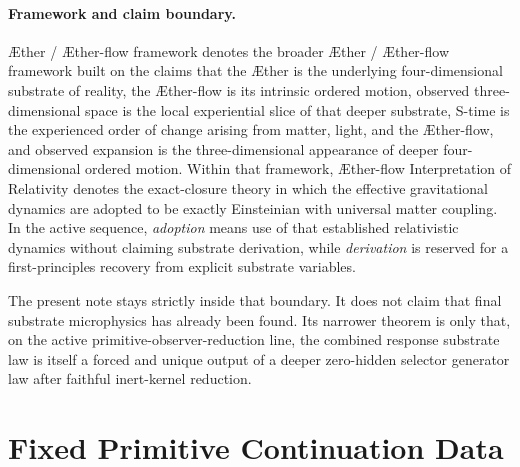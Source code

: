 \documentclass[11pt]{article}
\newcommand{\Aether}{\AE{}ther}
\newcommand{\Aflow}{\AE{}ther-flow}
\newcommand{\TheoryName}{\Aflow{} Interpretation of Relativity}
\newcommand{\TheoryProgram}{\Aether{} / \Aflow{} framework}
\begin{document}
\paragraph{Framework and claim boundary.}
\TheoryProgram{} denotes the broader \Aether{} / \Aflow{} framework built on the claims that the \Aether{} is the underlying four-dimensional substrate of reality, the \Aflow{} is its intrinsic ordered motion, observed three-dimensional space is the local experiential slice of that deeper substrate, S-time is the experienced order of change arising from matter, light, and the \Aflow{}, and observed expansion is the three-dimensional appearance of deeper four-dimensional ordered motion. Within that framework, \TheoryName{} denotes the exact-closure theory in which the effective gravitational dynamics are adopted to be exactly Einsteinian with universal matter coupling. In the active sequence, \emph{adoption} means use of that established relativistic dynamics without claiming substrate derivation, while \emph{derivation} is reserved for a first-principles recovery from explicit substrate variables.

The present note stays strictly inside that boundary. It does not claim that final substrate microphysics has already been found. Its narrower theorem is only that, on the active primitive-observer-reduction line, the combined response substrate law is itself a forced and unique output of a deeper zero-hidden selector generator law after faithful inert-kernel reduction.

\section{Fixed Primitive Continuation Data}
\end{document}
